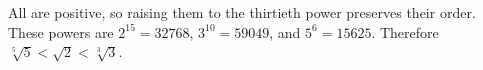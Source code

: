 All are positive, so raising them to the thirtieth power preserves their order. These powers are $2^{15}=32768$, $3^{10}=59049$, and $5^6=15625$. Therefore $\boxed{\sqrt[5]5<\sqrt2<\sqrt[3]3}$.
